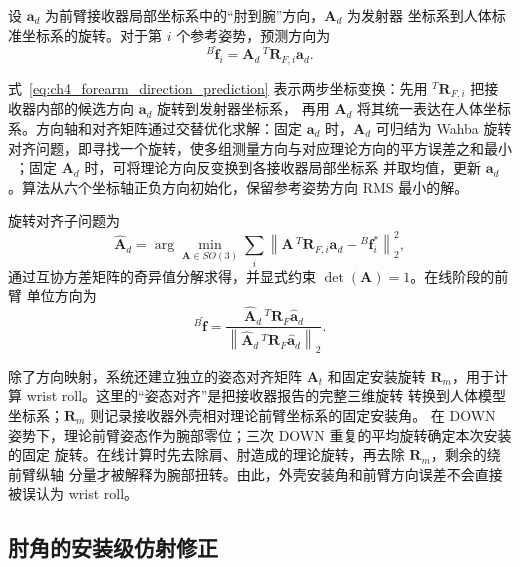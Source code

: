 设 $\boldsymbol a_d$ 为前臂接收器局部坐标系中的“肘到腕”方向，$\boldsymbol A_d$ 为发射器
坐标系到人体标准坐标系的旋转。对于第 $i$ 个参考姿势，预测方向为
\begin{equation}
  {}^{B}\hat{\boldsymbol f}_i=
  \boldsymbol A_d\,{}^{T}\boldsymbol R_{F,i}\boldsymbol a_d.
  \label{eq:ch4_forearm_direction_prediction}
\end{equation}

式~\eqref{eq:ch4_forearm_direction_prediction} 表示两步坐标变换：先用
${}^{T}\boldsymbol R_{F,i}$ 把接收器内部的候选方向 $\boldsymbol a_d$ 旋转到发射器坐标系，
再用 $\boldsymbol A_d$ 将其统一表达在人体坐标系。方向轴和对齐矩阵通过交替优化求解：固定
$\boldsymbol a_d$ 时，$\boldsymbol A_d$ 可归结为
Wahba 旋转对齐问题，即寻找一个旋转，使多组测量方向与对应理论方向的平方误差之和最小
~\cite{wahba1965least}；固定 $\boldsymbol A_d$ 时，可将理论方向反变换到各接收器局部坐标系
并取均值，更新 $\boldsymbol a_d$。算法从六个坐标轴正负方向初始化，保留参考姿势方向 RMS
最小的解。

旋转对齐子问题为
\begin{equation}
  \hat{\boldsymbol A}_d=
  \arg\min_{\boldsymbol A\in SO(3)}
  \sum_i\left\|
  \boldsymbol A\,{}^{T}\boldsymbol R_{F,i}\boldsymbol a_d-
  {}^{B}\boldsymbol f_i^{*}
  \right\|_2^2,
  \label{eq:ch4_forearm_wahba_problem}
\end{equation}
通过互协方差矩阵的奇异值分解求得，并显式约束 $\det(\boldsymbol A)=1$。在线阶段的前臂
单位方向为
\begin{equation}
  {}^{B}\hat{\boldsymbol f}=
  \frac{
    \hat{\boldsymbol A}_d\,{}^{T}\boldsymbol R_F\hat{\boldsymbol a}_d
  }{
    \left\|
      \hat{\boldsymbol A}_d\,{}^{T}\boldsymbol R_F\hat{\boldsymbol a}_d
    \right\|_2
  }.
  \label{eq:ch4_forearm_direction_online}
\end{equation}

除了方向映射，系统还建立独立的姿态对齐矩阵 $\boldsymbol A_t$ 和固定安装旋转
$\boldsymbol R_m$，用于计算 wrist roll。这里的“姿态对齐”是把接收器报告的完整三维旋转
转换到人体模型坐标系；$\boldsymbol R_m$ 则记录接收器外壳相对理论前臂坐标系的固定安装角。
在 DOWN 姿势下，理论前臂姿态作为腕部零位；三次 DOWN 重复的平均旋转确定本次安装的固定
旋转。在线计算时先去除肩、肘造成的理论旋转，再去除 $\boldsymbol R_m$，剩余的绕前臂纵轴
分量才被解释为腕部扭转。由此，外壳安装角和前臂方向误差不会直接被误认为 wrist roll。

\subsection{肘角的安装级仿射修正}
\label{subsec:ch4_elbow_affine_correction}

